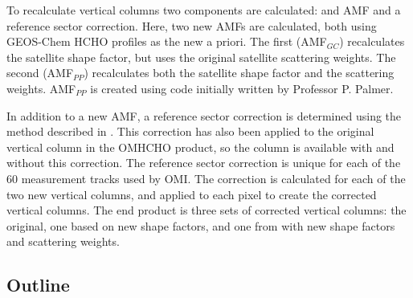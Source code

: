   
  To recalculate vertical columns two components are calculated: and AMF and a reference sector correction.
  Here, two new AMFs are calculated, both using GEOS-Chem HCHO profiles as the new a priori. 
  The first (AMF$_{GC}$) recalculates the satellite shape factor, but uses the original satellite scattering weights.
  The second (AMF$_{PP}$) recalculates both the satellite shape factor and the scattering weights.
  AMF$_{PP}$ is created using code initially written by Professor P. Palmer. %
  
  In addition to a new AMF, a reference sector correction is determined using the method described in \textcite{Abad2016}. %
  This correction has also been applied to the original vertical column in the OMHCHO product, so the column is available with and without this correction.
  The reference sector correction is unique for each of the 60 measurement tracks used by OMI.
  The correction is calculated for each of the two new vertical columns, and applied to each pixel to create the corrected vertical columns. 
  The end product is three sets of corrected vertical columns: the original, one based on new shape factors, and one from with new shape factors and scattering weights.
  
  \subsection{Outline}
    \label{Model:omiRecalc:outline}
    
